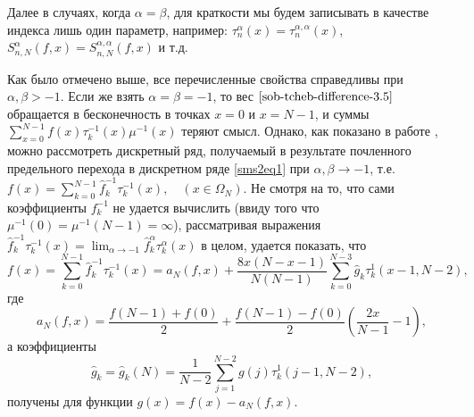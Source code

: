 Далее в случаях, когда $\alpha = \beta$, для краткости мы будем записывать в качестве индекса лишь один параметр, например: $\tau_{n}^{\alpha}(x) = \tau_{n}^{\alpha,\alpha}(x)$, $S_{n,N}^{\alpha}(f,x) = S_{n,N}^{\alpha,\alpha}(f,x)$ и т.д.



Как было отмечено выше, все перечисленные свойства справедливы при $\alpha, \beta > -1$. Если же взять $\alpha = \beta = -1$, то вес $\eqref{sob-tcheb-difference-3.5}$ обращается в бесконечность в точках $x=0$ и $x=N-1$, и суммы $\sum\limits_{x=0}^{N-1} f(x)\tau_{k}^{-1}(x)\mu^{-1}(x)$ теряют смысл.
Однако, как показано в работе \cite{smsshti1}, можно рассмотреть дискретный ряд, получаемый в результате почленного предельного перехода в дискретном ряде \eqref{sms2eq1} при $\alpha,\beta \rightarrow -1$, т.е. $f(x) = \sum\limits_{k=0}^{N-1}\hat{f}^{-1}_k\tau_{k}^{-1}(x),\quad (x \in \Omega_N)$. %
Не смотря на то, что сами коэффициенты $f_k^{-1}$ не удается вычислить (ввиду того что $\mu^{-1}(0)=\mu^{-1}(N-1)=\infty$), рассматривая выражения $\hat{f}^{-1}_k\tau_{k}^{-1}(x) = \lim_{\alpha \rightarrow -1} \hat{f}^{\alpha}_k\tau_k^{\alpha}(x)$ в целом, удается показать, что
\begin{equation}
\label{limitR}
 f(x) = \sum\limits_{k=0}^{N-1}\hat{f}^{-1}_k  \tau_{k}^{-1}(x) =
a_N(f,x) + \frac{8x(N-x-1)}{N(N-1)} \sum\limits_{k=0}^{N-3} \hat{g}_k \tau_{k}^{1}(x-1,N-2),
\end{equation}
где
\begin{equation}
\label{af}
a_N(f,x) = \frac{f(N-1)+f(0)}{2} + \frac{f(N-1)-f(0)}{2}\left( \frac{2x}{N-1}-1\right),
\end{equation}
а коэффициенты
\begin{equation}
\label{gk}
\hat{g}_k = \hat{g}_k(N) = \frac{1}{N-2} \sum\limits_{j=1}^{N-2} g(j) \tau_{k}^{1}(j-1,N-2) ,
\end{equation}
получены для функции $g(x) = f(x) - a_N(f,x)$.

